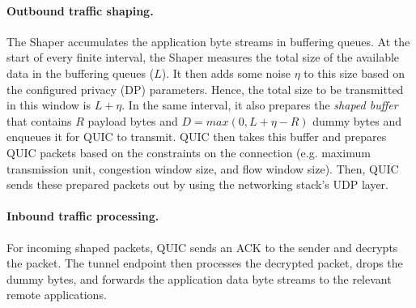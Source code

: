 \paragraph{Outbound traffic shaping.}
The Shaper accumulates the application byte streams in buffering queues.
At the start of every finite interval, the Shaper measures the total size of the available data in the buffering queues ($L$). 
It then adds some noise $\eta$ to this size based on the configured privacy (DP) parameters.
Hence, the total size to be transmitted in this window is $L + \eta$.
In the same interval, it also prepares the \textit{shaped buffer} that contains $R$ payload bytes and $D = max(0, L + \eta - R)$ dummy bytes and enqueues it for QUIC to transmit.
QUIC then takes this buffer and prepares QUIC packets based on the constraints on the connection (e.g. maximum transmission unit, congestion window size, and flow window size).
Then, QUIC sends these prepared packets out by using the networking stack's UDP layer.

\paragraph{Inbound traffic processing.}
For incoming shaped packets, QUIC sends an ACK to the sender and decrypts the packet.
The tunnel endpoint then processes the decrypted packet, drops the dummy bytes, and forwards the application data byte streams to the relevant remote applications.

\endinput